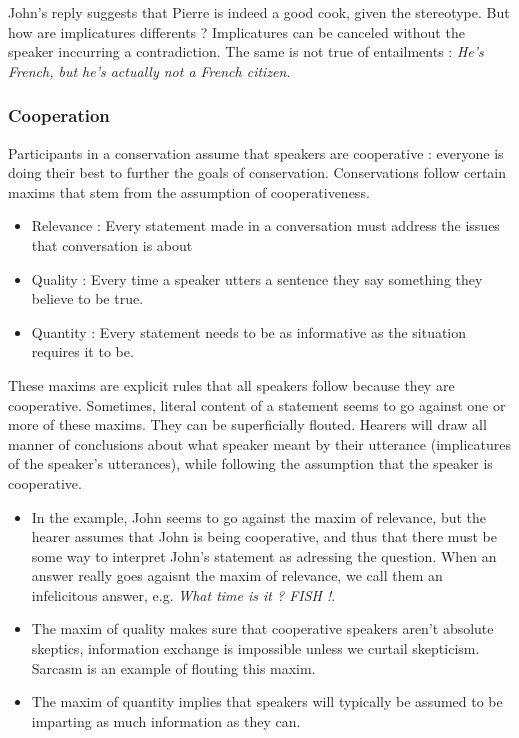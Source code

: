 \documentclass{cours}
\begin{document}
John's reply suggests that Pierre is indeed a good cook, given the stereotype. But how are implicatures differents ? Implicatures can be canceled without the speaker inccurring a contradiction. The same is not true of entailments\! : \textsl{He's French, but he's actually not a French citizen}.

\subsubsection{Cooperation}
\begin{proposition}
    Participants in a conservation assume that speakers are cooperative\! : everyone is doing their best to further the goals of conservation. Conservations follow certain maxims that stem from the assumption of cooperativeness.

    \begin{itemize}
        \item Relevance\! : Every statement made in a conversation must address the issues that conversation is about
        \item Quality\! : Every time a speaker utters a sentence they say something they believe to be true.
        \item Quantity\! : Every statement needs to be as informative as the situation requires it to be.
    \end{itemize}
\end{proposition}

These maxims are explicit rules that all speakers follow because they are cooperative. Sometimes, literal content of a statement seems to go against one or more of these maxims. They can be superficially flouted. Hearers will draw all manner of conclusions about what speaker meant by their utterance (implicatures of the speaker's utterances), while following the assumption that the speaker is cooperative.

\begin{itemize}
    \item In the example, John seems to go against the maxim of relevance, but the hearer assumes that John is being cooperative, and thus that there must be some way to interpret John's statement as adressing the question. When an answer really goes agaisnt the maxim of relevance, we call them an infelicitous answer, e.g. \textsl{What time is it ? FISH !}.
    \item The maxim of quality makes sure that cooperative speakers aren't absolute skeptics, information exchange is impossible unless we curtail skepticism. Sarcasm is an example of flouting this maxim.
    \item The maxim of quantity implies that speakers will typically be assumed to be imparting as much information as they can.
\end{itemize}
\end{document}
